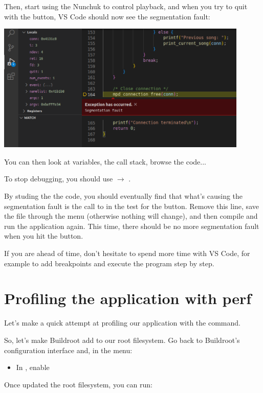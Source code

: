 Then, start using the Nunchuk to control playback, and when you try to
quit with the  button, VS Code should now see the segmentation
fault:

\includegraphics[width=12cm]{labs/sysdev-application-development-and-debugging/vscode-segmentation-fault.png}

You can then look at variables, the call stack, browse the code...

To stop debugging, you should use  $\rightarrow$ .

By studing the the code, you should eventually find that what's causing
the segmentation fault is the call to  in the test for the
 button. Remove this line, save the file through the 
menu (otherwise nothing will change), and then compile and run the
application again. This time, there should be no more segmentation fault
when you hit the  button.

If you are ahead of time, don't hesitate to spend more time with VS
Code, for example to add breakpoints and execute the program step by
step.

\section{Profiling the application with perf}

Let's make a quick attempt at profiling our application with the
 command.

So, let's make Buildroot add  to our root filesystem.
Go back to Buildroot's configuration interface and, in the
 menu:
\begin{itemize}
\item In , enable 
\end{itemize}

Once updated the root filesystem, you can run:

